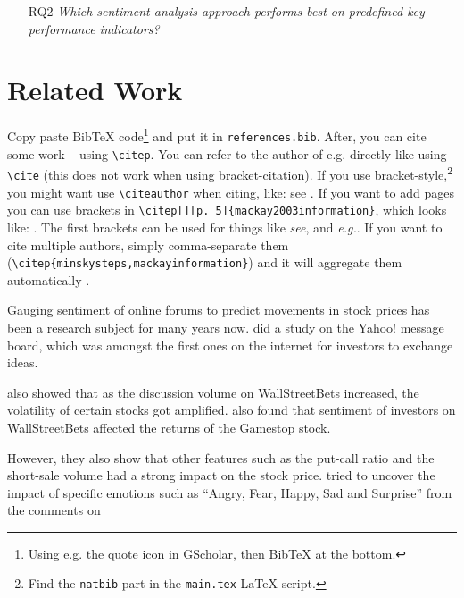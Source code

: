 \documentclass[11pt, a4paper]{article}
\begin{document}
\begin{itemize}
    \item[RQ2] \emph{Which sentiment analysis approach performs best on predefined key performance indicators?}
\end{itemize}

\section{Related Work}

Copy paste BibTeX code\footnote{Using e.g. the quote icon in GScholar, then BibTeX at the bottom.} and put it in \texttt{references.bib}. After, you can cite some work -- using \texttt{\textbackslash citep}. You can refer to the author of e.g. \cite{minsky1961steps} directly like using \texttt{\textbackslash cite} (this does not work when using bracket-citation). If you use bracket-style,\footnote{Find the \texttt{natbib} part in the \texttt{main.tex} \LaTeX{} script.} you might want use \texttt{\textbackslash citeauthor} when citing, like: see \citeauthor{ananny2018seeing} \cite{ananny2018seeing}.  If you want to add pages you can use brackets in \texttt{\textbackslash citep[][p. 5]\{mackay2003information\}}, which looks like: \citep[][p. 5]{mackay2003information}. The first brackets can be used for things like \emph{see}, and \emph{e.g.}. If you want to cite multiple authors, simply comma-separate them (\texttt{\textbackslash citep\{\-minsky\-steps,\-mackay\-information\}}) and it will aggregate them automatically \citep{minsky1961steps,mackay2003information}.

Gauging sentiment of online forums to predict movements in stock prices has been a research subject for many years now. 
\citep{das2007yahoo} did a study on the Yahoo! message board, which was amongst the first ones on the internet for investors to exchange ideas. 

also showed that as the discussion volume on WallStreetBets increased, the volatility of certain stocks got amplified. 
\citep{umar2021ataleofcompanyfundamentals} also found that sentiment of investors on WallStreetBets affected the returns of the Gamestop stock. 

However, they also show that other features such as the put-call ratio and the short-sale volume had a strong impact on the stock price.
\citep{long2021LikeTheStock} tried to uncover the impact of specific emotions such as “Angry, Fear, Happy, Sad and Surprise” from the comments on 
\end{document}
